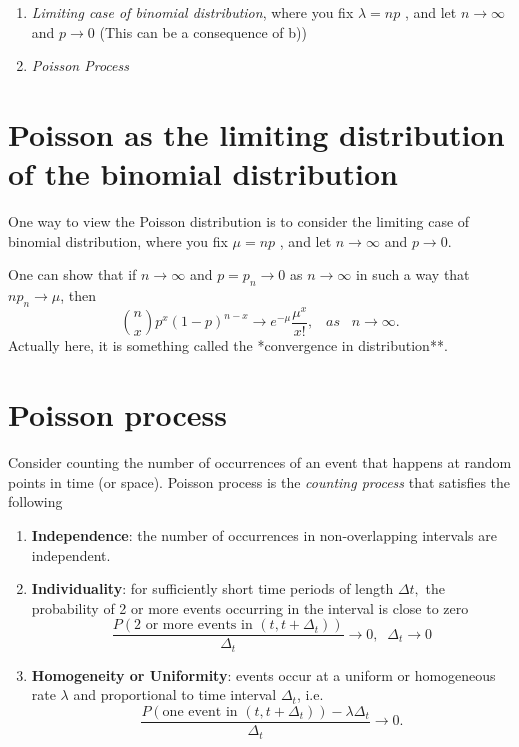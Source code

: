 \documentclass[
]{book}
\theoremstyle{definition}
\theoremstyle{definition}
\theoremstyle{definition}
\theoremstyle{definition}
\theoremstyle{remark}
\begin{document}
\begin{enumerate}
\def\labelenumi{\arabic{enumi}.}
\item
  \emph{Limiting case of binomial distribution}, where you fix \(\lambda = np\) , and let \(n \rightarrow \infty\) and \(p \rightarrow 0\) (This can be a consequence of b))
\item
  \emph{Poisson Process}
\end{enumerate}

\hypertarget{poisson-as-the-limiting-distribution-of-the-binomial-distribution}{%
\section{Poisson as the limiting distribution of the binomial distribution}\label{poisson-as-the-limiting-distribution-of-the-binomial-distribution}}

One way to view the Poisson distribution is to consider the limiting case of binomial distribution, where you fix \(\mu = np\) , and let \(n \rightarrow \infty\) and \(p \rightarrow 0\).

One can show that if \(n\to \infty\) and \(p=p_n \to 0\) as \(n\to \infty\) in such a way that \(n p_n \to \mu\), then
\[
{n \choose x} p^x (1-p)^{n-x} \to e^{-\mu} \frac{ \mu^x}{x!},\;\;\;as\;\;\; n\to \infty.
\]
Actually here, it is something called the *convergence in distribution**.

\hypertarget{poisson-process}{%
\section{Poisson process}\label{poisson-process}}

Consider counting the number of occurrences of an event that happens at random points in time (or space). Poisson process is the \emph{counting process} that satisfies the following

\begin{enumerate}
\def\labelenumi{\arabic{enumi}.}
\item
  \textbf{Independence}: the number of occurrences in non-overlapping
  intervals are independent.
\item
  \textbf{Individuality}: for sufficiently short time periods of length
  \(\Delta t,\) the probability of 2 or more events occurring in the interval is
  close to zero
  \[
  \frac{P\left(  \text{2 or more events in }(t,t+\Delta_t)\right)}{\Delta_t}  \rightarrow 0,\;\; \Delta_t \to 0
  \]
\item
  \textbf{Homogeneity or Uniformity}: events occur at a uniform or
  homogeneous rate \(\lambda\) and proportional to time interval \(\Delta_t\), i.e.
  \[
  \frac{P\left(  \text{one event in }(t,t+\Delta_t)\right) - \lambda\Delta_t }{\Delta_t}  \to 0.
  \]
\end{enumerate}
\end{document}
